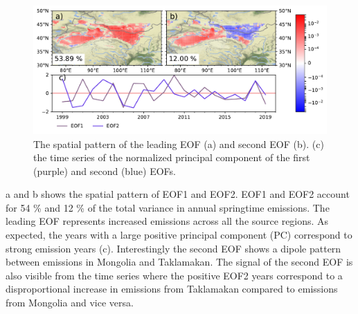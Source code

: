\begin{figure}[htbp]
    \centering
    \includegraphics[width=\textwidth]{texfiles/figs/Emissions_EOF.pdf}
    \caption{The spatial pattern of the leading EOF (a) and second EOF (b). (c) the time series of the normalized principal component of the first (purple) and second (blue) EOFs.}
    \label{fig:emissions_eof}
\end{figure}
a and b shows the spatial pattern of EOF1 and EOF2. EOF1 and EOF2 account for 54 \% and 12 \% of the total variance in annual springtime emissions. 
The leading EOF represents increased emissions across all the source regions. 
As expected, the years with a large positive principal component (PC) correspond to strong emission years (c). 
Interestingly the second EOF shows a dipole pattern between emissions in Mongolia and Taklamakan. 
The signal of the second EOF is also visible from the time series where the positive EOF2 years correspond to a disproportional increase in emissions from Taklamakan compared to emissions from Mongolia and vice versa.       

